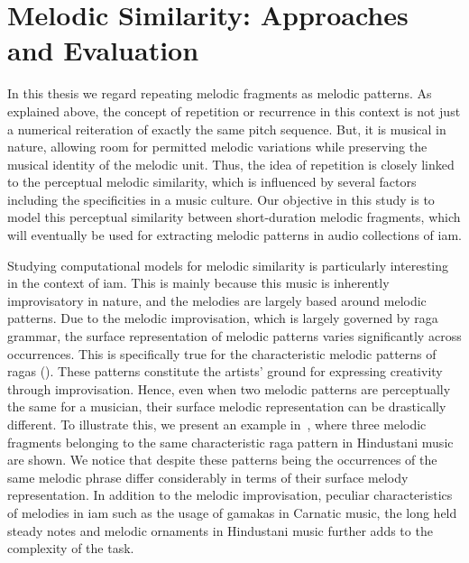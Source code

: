 \section{Melodic Similarity: Approaches and Evaluation}
\label{sec:patterns_evaluation_of_similarity_measures}

In this thesis we regard repeating melodic fragments as melodic patterns. As explained above, the concept of repetition or recurrence in this context is not just a numerical reiteration of exactly the same pitch sequence. But, it is musical in nature, allowing room for permitted melodic variations while preserving the musical identity of the melodic unit. Thus, the idea of repetition is closely linked to the perceptual melodic similarity, which is influenced by several factors including the specificities in a music culture. Our objective in this study is to model this perceptual similarity between short-duration melodic fragments, which will eventually be used for extracting melodic patterns in audio collections of \gls{iam}.

Studying computational models for melodic similarity is particularly interesting in the context of \gls{iam}. This is mainly because this music is inherently improvisatory in nature, and the melodies are largely based around melodic patterns. Due to the melodic improvisation, which is largely governed by \gls{raga} grammar, the surface representation of melodic patterns varies significantly across occurrences. This is specifically true for the characteristic melodic patterns of \glspl{raga} (). These patterns constitute the artists' ground for expressing creativity through improvisation. Hence, even when two melodic patterns are perceptually the same for a musician, their surface melodic representation can be drastically different. To illustrate this, we present an example in~, where three melodic fragments belonging to the same characteristic \gls{raga} pattern in Hindustani music are shown. We notice that despite these patterns being the occurrences of the same melodic phrase differ considerably in terms of their surface melody representation. In addition to the melodic improvisation, peculiar characteristics of melodies in \gls{iam} such as the usage of \glspl{gamaka} in Carnatic music, the long held steady notes and melodic ornaments in Hindustani music further adds to the complexity of the task.


